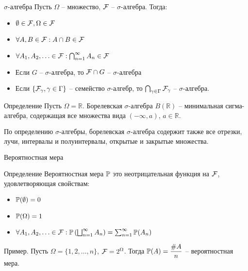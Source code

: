 \documentclass{beamer}
\begin{document}
\begin{frame}{$\sigma$-алгебра}
    Пусть $\Omega$ -- множество, $\mathcal{F}$ -- $\sigma$-алгебра. Тогда:
    \begin{itemize}
        \item $\emptyset \in \mathcal{F}, \Omega \in \mathcal{F}$
        \item $\forall A, B \in \mathcal{F}: A\cap B\in \mathcal{F}$
        \item $\forall A_1, A_2, \ldots \in \mathcal{F}: \bigcap_{n=1}^{\infty} A_n \in \mathcal{F}$
        \item Если $G$ -- $\sigma$-алгебра, то $\mathcal{F}\cap G$ -- $\sigma$-алгебра
        \item Если $\{\mathcal{F}_{\gamma}, \gamma\in\Gamma\}$ -- семейство $\sigma$-алгебр, то $\bigcap_{\gamma \in \Gamma} \mathcal{F}_{\gamma}$ -- $\sigma$-алгебра.
    \end{itemize}
    \begin{block}{Определение}
        Пусть $\Omega=\mathbb{R}$. Борелевская $\sigma$-алгебра $B(\mathbb{R})$ -- минимальная сигма-алгебра, содержащая все множества вида $(-\infty, a)$, $a\in \mathbb{R}$.
    \end{block}

    По определению $\sigma$-алгебры, борелевская $\sigma$-алгебра содержит также все отрезки, лучи, интервалы и полуинтервалы, открытые и закрытые множества.
\end{frame}

\begin{frame}{Вероятностная мера}
    \begin{block}{Определение}
        Вероятностная мера $\mathbb{P}$ это неотрицательная функция на $\mathcal{F}$, удовлетворяющая свойствам:
        \begin{itemize}
            \item $\mathbb{P}(\emptyset) = 0$
            \item $\mathbb{P}(\Omega) = 1$
            \item $\forall A_1, A_2, \ldots \in \mathcal{F}: \mathbb{P}\left(\bigsqcup_{n=1}^{\infty}A_n\right) = \sum_{n=1}^{\infty} \mathbb{P}(A_n)$ 
        \end{itemize}
    \end{block}
    Пример. Пусть $\Omega = \{1, 2, \ldots, n\}$, $\mathcal{F}=2^{\Omega}$. Тогда $\mathbb{P}(A)=\dfrac{\#A}{n}$ -- вероятностная мера.
\end{frame}
\end{document}
